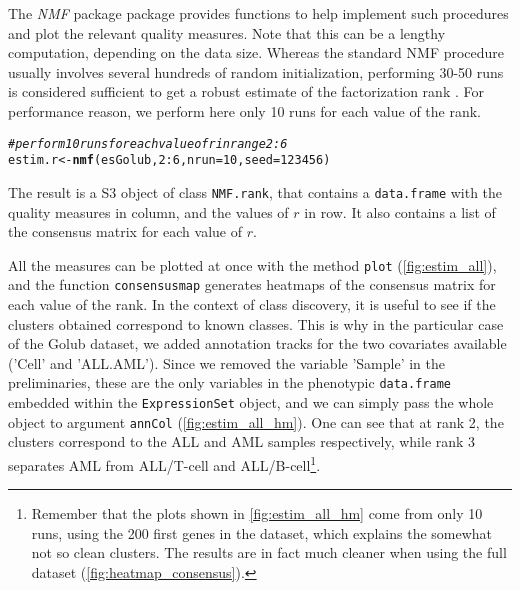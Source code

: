 \documentclass[a4paper]{article}\usepackage[]{graphicx}\usepackage[]{color}
\makeatletter
\newcommand{\hlnum}[1]{\textcolor[rgb]{0.686,0.059,0.569}{#1}}%
\newcommand{\hlcom}[1]{\textcolor[rgb]{0.678,0.584,0.686}{\textit{#1}}}%
\newcommand{\hlopt}[1]{\textcolor[rgb]{0,0,0}{#1}}%
\newcommand{\hlstd}[1]{\textcolor[rgb]{0.345,0.345,0.345}{#1}}%
\newcommand{\hlkwb}[1]{\textcolor[rgb]{0.69,0.353,0.396}{#1}}%
\newcommand{\hlkwc}[1]{\textcolor[rgb]{0.333,0.667,0.333}{#1}}%
\newcommand{\hlkwd}[1]{\textcolor[rgb]{0.737,0.353,0.396}{\textbf{#1}}}%
\newenvironment{kframe}{%
 \def\at@end@of@kframe{}%
 \ifinner\ifhmode%
  \def\at@end@of@kframe{\end{minipage}}%
  \begin{minipage}{\columnwidth}%
 \fi\fi%
 \def\FrameCommand##1{\hskip\@totalleftmargin \hskip-\fboxsep
 \colorbox{shadecolor}{##1}\hskip-\fboxsep
     \hskip-\linewidth \hskip-\@totalleftmargin \hskip\columnwidth}%
 \MakeFramed {\advance\hsize-\width
   \@totalleftmargin\z@ \linewidth\hsize
   \@setminipage}}%
 {\par\unskip\endMakeFramed%
 \at@end@of@kframe}
\newenvironment{knitrout}{}{} %
\let\code=\texttt
\newcommand{\pkgname}[1]{\textit{#1}\xspace}
\newcommand{\Rpkg}[1]{\pkgname{#1} package\xspace}
\newcommand{\nmfpack}{\Rpkg{NMF}}
\renewcommand{\cite}[1]{\parencite{#1}}
\makeatother
\begin{document}
The \nmfpack package provides functions to help implement such procedures and plot the relevant quality measures.
Note that this can be a lengthy computation, depending on the data size.
Whereas the standard NMF procedure usually involves several hundreds of random initialization, performing 30-50 runs is considered sufficient to get a robust estimate of the factorization rank \cite{Brunet2004, Hutchins2008}.
For performance reason, we perform here only 10 runs for each value of the rank.

\begin{knitrout}
\color{fgcolor}\begin{kframe}
\begin{alltt}
\hlcom{# perform 10 runs for each value of r in range 2:6}
\hlstd{estim.r} \hlkwb{<-} \hlkwd{nmf}\hlstd{(esGolub,} \hlnum{2}\hlopt{:}\hlnum{6}\hlstd{,} \hlkwc{nrun}\hlstd{=}\hlnum{10}\hlstd{,} \hlkwc{seed}\hlstd{=}\hlnum{123456}\hlstd{)}
\end{alltt}
\end{kframe}
\end{knitrout}

The result is a S3 object of class \code{NMF.rank}, that contains a \code{data.frame} with the quality measures in column, and the values of $r$ in row.
It also contains a list of the consensus matrix for each value of $r$.

All the measures can be plotted at once with the method \code{plot} (\cref{fig:estim_all}), and the function \code{consensusmap} generates heatmaps of the consensus matrix for each value of the rank.
In the context of class discovery, it is useful to see if the clusters obtained correspond to known classes.
This is why in the particular case of the Golub dataset, we added annotation tracks for the two covariates available ('Cell' and 'ALL.AML').
Since we removed the variable 'Sample' in the preliminaries, these are the only variables in the phenotypic \code{data.frame} embedded within the \code{ExpressionSet} object, and we can simply pass the whole object to argument \code{annCol} (\cref{fig:estim_all_hm}).
One can see that at rank 2, the clusters correspond to the ALL and AML samples respectively, while rank 3 separates AML from ALL/T-cell and ALL/B-cell\footnote{Remember that the plots shown in \cref{fig:estim_all_hm} come from only 10 runs, using the 200 first genes in the dataset, which explains the somewhat not so clean clusters.
The results are in fact much cleaner when using the full dataset (\cref{fig:heatmap_consensus}).}.
\end{document}
